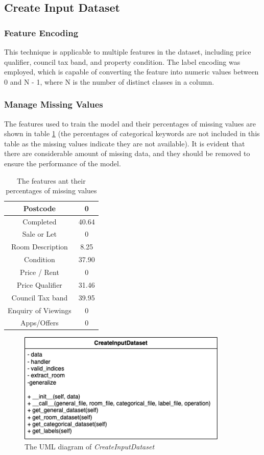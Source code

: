 \documentclass[12pt,twoside]{report}
\begin{document}
\subsection{Create Input Dataset}

\subsubsection{Feature Encoding}
This technique is applicable to multiple features in the dataset, including price qualifier, council tax band, and property condition. The label encoding was employed, which is capable of converting the feature into numeric values between 0 and N - 1, where N is the number of distinct classes in a column.

\subsubsection{Manage Missing Values}
The features used to train the model and their percentages of missing values are shown in table \ref{feature_missing_percentage} (the percentages of categorical keywords are not included in this table as the missing values indicate they are not available). It is evident that there are considerable amount of missing data, and they should be removed to ensure the performance of the model.
\begin{table}[h]
	\centering
	\caption{The features ant their percentages of missing values}
	\begin{tabular}{| c | c |}
		\hline
		Postcode & 0 \\ 
		\hline
		Completed & 40.64 \\
		\hline
		Sale or Let & 0 \\ 
		\hline
		Room Description & 8.25 \\
		\hline
		Condition & 37.90 \\ 
		\hline
		Price / Rent & 0 \\
		\hline
		Price Qualifier & 31.46 \\
		\hline
		Council Tax band & 39.95 \\ 
		\hline
		Enquiry of Viewings & 0 \\ 
		\hline
		Apps/Offers & 0 \\
		\hline
	\end{tabular}
	\label{feature_missing_percentage}
\end{table}

\begin{figure}[h]
	\centering
	\includegraphics[width=10cm]{uml_create_input_dataset}
	\caption{The UML diagram of \textit{CreateInputDataset}}
	\label{uml_create_input_dataset}
\end{figure}
\end{document}
